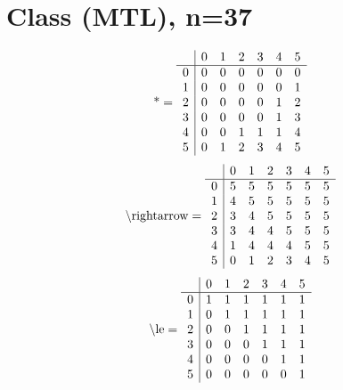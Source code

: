 \documentclass[11pt]{article}
\begin{document}
\section{Class (MTL), n=37}
\[\text{*} = 
\begin{array}{r | r r r r r r}
 & 0 & 1 & 2 & 3 & 4 & 5 \\ \hline
0 & 0 & 0 & 0 & 0 & 0 & 0 \\
1 & 0 & 0 & 0 & 0 & 0 & 1 \\
2 & 0 & 0 & 0 & 0 & 1 & 2 \\
3 & 0 & 0 & 0 & 0 & 1 & 3 \\
4 & 0 & 0 & 1 & 1 & 1 & 4 \\
5 & 0 & 1 & 2 & 3 & 4 & 5 \\
\end{array}
\]
\[\text{\textbackslash rightarrow} = 
\begin{array}{r | r r r r r r}
 & 0 & 1 & 2 & 3 & 4 & 5 \\ \hline
0 & 5 & 5 & 5 & 5 & 5 & 5 \\
1 & 4 & 5 & 5 & 5 & 5 & 5 \\
2 & 3 & 4 & 5 & 5 & 5 & 5 \\
3 & 3 & 4 & 4 & 5 & 5 & 5 \\
4 & 1 & 4 & 4 & 4 & 5 & 5 \\
5 & 0 & 1 & 2 & 3 & 4 & 5 \\
\end{array}
\]
\[\text{\textbackslash le} = 
\begin{array}{r | r r r r r r}
 & 0 & 1 & 2 & 3 & 4 & 5 \\ \hline
0 & 1 & 1 & 1 & 1 & 1 & 1 \\
1 & 0 & 1 & 1 & 1 & 1 & 1 \\
2 & 0 & 0 & 1 & 1 & 1 & 1 \\
3 & 0 & 0 & 0 & 1 & 1 & 1 \\
4 & 0 & 0 & 0 & 0 & 1 & 1 \\
5 & 0 & 0 & 0 & 0 & 0 & 1 \\
\end{array}
\]
\end{document}
